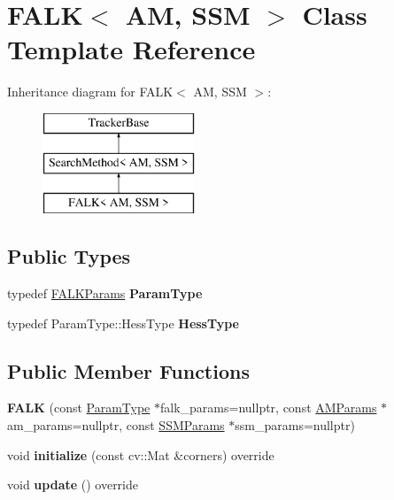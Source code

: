 \hypertarget{classFALK}{\section{F\-A\-L\-K$<$ A\-M, S\-S\-M $>$ Class Template Reference}
\label{classFALK}
}
Inheritance diagram for F\-A\-L\-K$<$ A\-M, S\-S\-M $>$\-:\begin{figure}[H]
\begin{center}
\leavevmode
\includegraphics[height=3.000000cm]{classFALK}
\end{center}
\end{figure}
\subsection*{Public Types}
\begin{DoxyCompactItemize}
\item 
\hypertarget{classFALK_aa5546fa0c3e416e395f4c7b6bdac83b0}{typedef \hyperlink{structFALKParams}{F\-A\-L\-K\-Params} {\bfseries Param\-Type}}\label{classFALK_aa5546fa0c3e416e395f4c7b6bdac83b0}

\item 
\hypertarget{classFALK_aabe59f8aed651a0bb95bea0827371369}{typedef Param\-Type\-::\-Hess\-Type {\bfseries Hess\-Type}}\label{classFALK_aabe59f8aed651a0bb95bea0827371369}

\end{DoxyCompactItemize}
\subsection*{Public Member Functions}
\begin{DoxyCompactItemize}
\item 
\hypertarget{classFALK_a934cc0db0b9c6c403688049ee1c16610}{{\bfseries F\-A\-L\-K} (const \hyperlink{structFALKParams}{Param\-Type} $\ast$falk\-\_\-params=nullptr, const \hyperlink{structAMParams}{A\-M\-Params} $\ast$am\-\_\-params=nullptr, const \hyperlink{structSSMParams}{S\-S\-M\-Params} $\ast$ssm\-\_\-params=nullptr)}\label{classFALK_a934cc0db0b9c6c403688049ee1c16610}

\item 
\hypertarget{classFALK_aeb316fca47c41b04699c76c506176831}{void {\bfseries initialize} (const cv\-::\-Mat \&corners) override}\label{classFALK_aeb316fca47c41b04699c76c506176831}

\item 
\hypertarget{classFALK_a382f20a48618e7d9b3fd3f4fdbdacb7c}{void {\bfseries update} () override}\label{classFALK_a382f20a48618e7d9b3fd3f4fdbdacb7c}

\end{DoxyCompactItemize}
